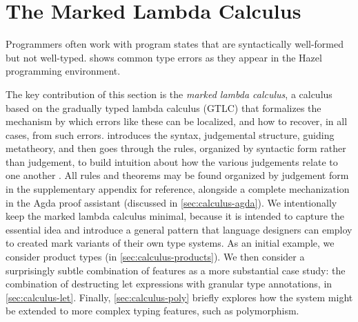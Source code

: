 \section{The Marked Lambda Calculus}
\label{sec:calculus}

Programmers often work with program states that are syntactically well-formed but not well-typed.
 shows common type errors as they appear in the Hazel programming
environment. 




The key contribution of this section is the \emph{marked lambda calculus}, a calculus based on the gradually typed lambda calculus (GTLC) that formalizes the mechanism by which errors like these can be localized, and how to  recover, in all cases, from such errors. 
 introduces the syntax, judgemental structure, guiding metatheory, and then goes through the rules, organized by syntactic form rather than judgement, to build intuition about how the various judgements relate to one another \cite{Siek06a}. All rules and theorems may be found organized by judgement form in the supplementary appendix for reference, 
alongside a complete mechanization in the Agda proof assistant \cite{norell:thesis} (discussed in
\cref{sec:calculus-agda}). We intentionally keep the marked lambda calculus minimal, because it is intended to capture the essential idea and introduce a general pattern that language designers can employ to created mark variants of their own type systems. As an initial example, we consider product types (in \cref{sec:calculus-products}). We then consider a surprisingly subtle combination of features as a more substantial case study: the combination of
destructing let expressions with granular type annotations, in \cref{sec:calculus-let}. Finally, \cref{sec:calculus-poly} briefly explores how
the system might be extended to more complex typing features, such as polymorphism.

